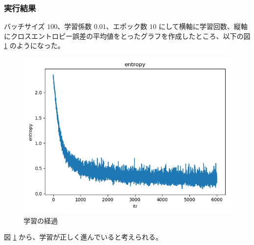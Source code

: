 \documentclass[a4paper,dvipdfmx]{jsarticle}
\begin{document}
\subsubsection*{実行結果}

バッチサイズ $100$、学習係数 $0.01$、エポック数 $10$ にして横軸に学習回数、縦軸にクロスエントロピー誤差の平均値をとったグラフを作成したところ、以下の図 \ref{fig-A-1-1} のようになった。

\begin{figure}[H]
\centering
\includegraphics[width=12cm]{report_ReLU10epoch.png}
\caption{学習の経過}
\label{fig-A-1-1}
\end{figure}

図 \ref{fig-A-1-1} から、学習が正しく進んでいると考えられる。
\end{document}
